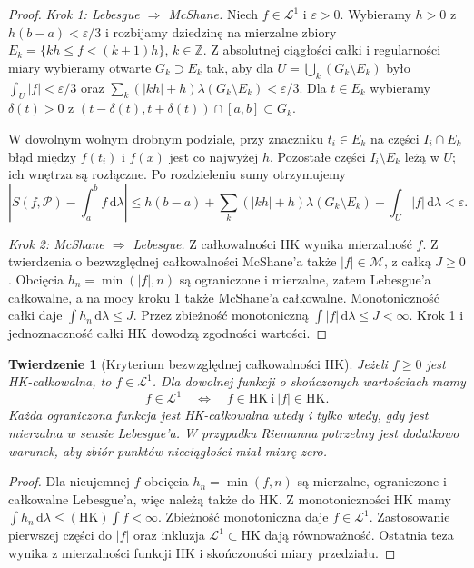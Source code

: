 \documentclass[11pt,a4paper]{article}
\numberwithin{equation}{section}
\theoremstyle{plain}
\newtheorem{twierdzenie}{Twierdzenie}[section]
\theoremstyle{definition}
\theoremstyle{remark}
\newcommand{\HK}{\mathrm{HK}}
\begin{document}
\begin{proof}
\emph{Krok 1: Lebesgue $\Rightarrow$ McShane.} Niech $f\in\mathcal L^1$ i $\varepsilon>0$. Wybieramy $h>0$ z $h(b-a)<\varepsilon/3$ i rozbijamy dziedzinę na mierzalne zbiory $E_k=\{kh\le f<(k+1)h\}$, $k\in\mathbb Z$. Z absolutnej ciągłości całki i regularności miary wybieramy otwarte $G_k\supset E_k$ tak, aby dla $U=\bigcup_k(G_k\setminus E_k)$ było $\int_U|f|<\varepsilon/3$ oraz $\sum_k(|kh|+h)\lambda(G_k\setminus E_k)<\varepsilon/3$. Dla $t\in E_k$ wybieramy $\delta(t)>0$ z $(t-\delta(t),t+\delta(t))\cap[a,b]\subset G_k$.

W dowolnym wolnym drobnym podziale, przy znaczniku $t_i\in E_k$ na części $I_i\cap E_k$ błąd między $f(t_i)$ i $f(x)$ jest co najwyżej $h$. Pozostałe części $I_i\setminus E_k$ leżą w $U$; ich wnętrza są rozłączne. Po rozdzieleniu sumy otrzymujemy
\[
\left|S(f,\mathcal P)-\int_a^b f\,\mathrm d\lambda\right|
\le h(b-a)+\sum_k(|kh|+h)\lambda(G_k\setminus E_k)+\int_U|f|\,\mathrm d\lambda<\varepsilon.
\]

\emph{Krok 2: McShane $\Rightarrow$ Lebesgue.} Z całkowalności HK wynika mierzalność $f$. Z twierdzenia o bezwzględnej całkowalności McShane'a także $|f|\in\mathcal M$, z całką $J\ge0$. Obcięcia $h_n=\min(|f|,n)$ są ograniczone i mierzalne, zatem Lebesgue'a całkowalne, a na mocy kroku 1 także McShane'a całkowalne. Monotoniczność całki daje $\int h_n\,\mathrm d\lambda\le J$. Przez zbieżność monotoniczną $\int|f|\,\mathrm d\lambda\le J<\infty$. Krok 1 i jednoznaczność całki HK dowodzą zgodności wartości.
\end{proof}
\begin{twierdzenie}[Kryterium bezwzględnej całkowalności HK]
Jeżeli $f\ge0$ jest HK-całkowalna, to $f\in\mathcal L^1$. Dla dowolnej funkcji o skończonych wartościach mamy
\[
f\in\mathcal L^1\quad\Longleftrightarrow\quad f\in\HK\ \text{i}\ |f|\in\HK.
\]
Każda ograniczona funkcja jest HK-całkowalna wtedy i tylko wtedy, gdy jest mierzalna w sensie Lebesgue'a. W przypadku Riemanna potrzebny jest dodatkowo warunek, aby zbiór punktów nieciągłości miał miarę zero.
\end{twierdzenie}
\begin{proof}
Dla nieujemnej $f$ obcięcia $h_n=\min(f,n)$ są mierzalne, ograniczone i całkowalne Lebesgue'a, więc należą także do HK. Z monotoniczności HK mamy $\int h_n\,\mathrm d\lambda\le(\HK)\int f<\infty$. Zbieżność monotoniczna daje $f\in\mathcal L^1$. Zastosowanie pierwszej części do $|f|$ oraz inkluzja $\mathcal L^1\subset\HK$ dają równoważność. Ostatnia teza wynika z mierzalności funkcji HK i skończoności miary przedziału.
\end{proof}
\end{document}
